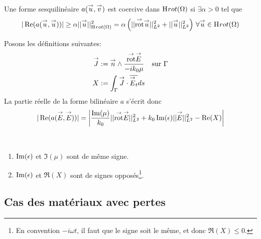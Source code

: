   \begin{defn}[Coercivité]
    Une forme sesquilinéaire \(a({\overset{\rightarrow}{u}},{\overset{\rightarrow}{v}})\) est coercive dans \(\mathrm{H}_\mathrm{{}}{rot}(\Omega)\) si \(\exists \alpha > 0\) tel que
    \[
      |\operatorname{Re}(a({\overset{\rightarrow}{u}},{\overset{\rightarrow}{u}}))| \ge \alpha ||{\overset{\rightarrow}{u}}||_{\mathrm{H}_\mathrm{{}}{rot}(\Omega)}^2 = \alpha \left( || {{\overset{\rightarrow}{\operatorname{rot}}}} {\overset{\rightarrow}{u}} ||_{L^2}^2 + || {\overset{\rightarrow}{u}} ||_{L^2}^2\right) \, \forall {\overset{\rightarrow}{u}} \in \mathrm{H}_\mathrm{{}}{rot}(\Omega)
    \]
   \end{defn}


  Posons les définitions suivantes:
  \begin{align*}
    {\overset{\rightarrow}{J}} &:=  {\overset{\rightarrow}{n}} \wedge \dfrac{{{\overset{\rightarrow}{\operatorname{rot}}}} {\overset{\rightarrow}{E}}}{-ik_0\mu} && \text{sur \(\Gamma\)}
    \\
    X&:= \int_\Gamma {\overset{\rightarrow}{J}} \cdot {\overline{{\overset{\rightarrow}{E}}_t}} ds
  \end{align*}
  La partie réelle de la forme bilinéaire \(a\) s'écrit donc
  \begin{equation}
    \label{eq:unicite:form_var:decomp_form_bilin_1}
    |\Re(a(\vE,\vE))| = \left|\frac{\Im(\mu)}{k_0} || \trot \vE ||_{L^2}^2  + k_0 \Im(\eps) || \vE ||_{L^2}^2
    - \Re(X)\right|
  \end{equation}

  \begin{hyp}\label{hyp:unicite:form_var:hyp_coercivite}
    ~{}

    \begin{enumerate}
      \item \(\operatorname{Im}(\epsilon)\) et \(\Im(\mu)\) sont de même signe.
      \item \(\operatorname{Im}(\epsilon)\) et \(\Re(X)\) sont de signes opposés\footnote{En convention \(-i\omega t\), il faut que le signe soit le même, et donc \(\Re(X) \le 0\).}.
    \end{enumerate}
  \end{hyp}

\subsection{Cas des matériaux avec pertes}

